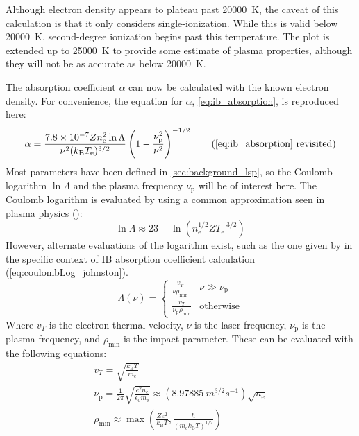         Although electron density appears to plateau past \qty{20000}{K}, the caveat of this calculation is that it only considers single-ionization. While this is valid below \qty{20000}{K}, second-degree ionization begins past this temperature. The plot is extended up to \qty{25000}{K} to provide some estimate of plasma properties, although they will not be as accurate as below \qty{20000}{K}.

        The absorption coefficient $\alpha$ can now be calculated with the known electron density. For convenience, the equation for $\alpha$, \autoref{eq:ib_absorption}, is reproduced here:
        \begin{equation*}
            \ibalphaeq \tag{\ref{eq:ib_absorption} revisited}
        \end{equation*}
        Most parameters have been defined in \autoref{sec:background_lsp}, so the Coulomb logarithm $\ln{\Lambda}$ and the plasma frequency $\nu_\mathrm{p}$ will be of interest here. The Coulomb logarithm is evaluated by \textcite{nassarInvestigationLasersustainedPlasma2012} using a common approximation seen in plasma physics (\textcite{richardson2019NRLPlasma2019}):
        \begin{equation}\label{eq:coulombLog_NRL}
            \ln{\Lambda} \approx 23-\ln{(n_\mathrm{e}^{1/2}ZT_\mathrm{e}^{-3/2})}
        \end{equation}
        However, alternate evaluations of the logarithm exist, such as the one given by \textcite{johnstonCorrectValuesHighfrequency1973} in the specific context of IB absorption coefficient calculation (\autoref{eq:coulombLog_johnston}). 
        \begin{equation} \label{eq:coulombLog_johnston}
            \Lambda(\nu) = \begin{cases}
                \frac{v_T}{\nu\rho_\mathrm{min}} & \nu \gg \nu_\mathrm{p}\\
                \frac{v_T}{\nu_\mathrm{p}\rho_\mathrm{min}} & \text{otherwise}
            \end{cases}
        \end{equation}
        Where $v_T$ is the electron thermal velocity, $\nu$ is the laser frequency, $\nu_\mathrm{p}$ is the plasma frequency, and $\rho_\mathrm{min}$ is the impact parameter. These can be evaluated with the following equations:
        \begin{gather}
            v_T = \sqrt{\frac{k_\mathrm{B}T}{m_\mathrm{e}}} \\
            \nu_\mathrm{p} = \frac{1}{2\pi}\sqrt{\frac{e^2n_\mathrm{e}}{\epsilon_0 m_\mathrm{e}}} \approx (\qty{8.97885}{m^{3/2}s^{-1}})\sqrt{n_\mathrm{e}}\\
            \rho_\mathrm{min} \approx \max{\left(\frac{Ze^2}{k_\mathrm{B}T}, \frac{\hbar}{(m_\mathrm{e}k_\mathrm{B}T)^{1/2}}\right)}
        \end{gather}
